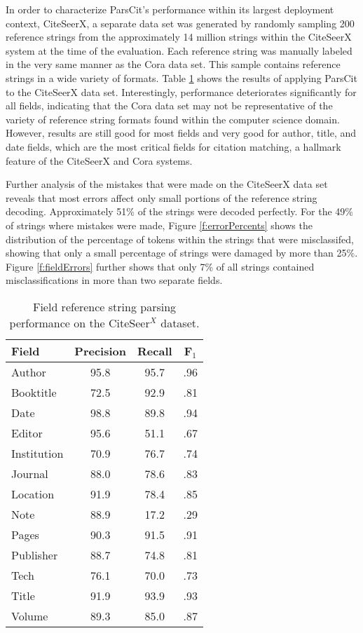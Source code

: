 \documentclass[10pt, a4paper]{article}
\begin{document}
In order to characterize ParsCit's performance within its largest deployment
context, CiteSeerX, a separate data set was generated by randomly sampling
200 reference strings from the approximately 14 million strings within the
CiteSeerX system at the time of the evaluation.  Each reference string was
manually labeled in the very same manner as the Cora data set.  This sample
contains reference strings in a wide variety of formats.  Table \ref{t:eval-csx}
shows the results of applying ParsCit to the CiteSeerX data set.  
Interestingly, performance
deteriorates significantly for all fields, indicating that the Cora data set may not
be representative of the variety of reference string formats found within the
computer science domain.  However, results are still good for most fields and very
good for author, title, and date fields, which are the most critical fields for
citation matching, a hallmark feature of the CiteSeerX and Cora systems.

Further analysis of the mistakes that were made on the CiteSeerX data set
reveals that most errors affect only small portions of the reference string decoding.
Approximately 51\% of the strings were decoded perfectly.  For the 49\% of
strings where mistakes were made, Figure \ref{f:errorPercents} shows the
distribution of the percentage of tokens within the strings that were misclassifed,
showing that only a small percentage of strings were damaged by more than
25\%.  Figure \ref{f:fieldErrors} further shows that only 7\% of all strings contained
misclassifications in more than two separate fields.

\begin{table}[htb]
\centering
\begin{tabular}{|l|c|c|c|}
\hline
Field & Precision & Recall & F$_1$ \\
\hline
Author	& 95.8	& 95.7	& .96 \\
Booktitle	& 72.5	& 92.9	& .81 \\
Date	& 98.8	& 89.8	& .94 \\
Editor	& 95.6	& 51.1	& .67 \\
Institution	& 70.9	& 76.7	& .74 \\
Journal	& 88.0	& 78.6	& .83 \\
Location	& 91.9	& 78.4	& .85 \\
Note	& 88.9	& 17.2	& .29 \\
Pages	& 90.3	& 91.5	& .91 \\
Publisher	& 88.7	& 74.8	& .81 \\
Tech	& 76.1	& 70.0	& .73 \\
Title	& 91.9	& 93.9	& .93 \\
Volume	& 89.3	& 85.0	& .87 \\
\hline
\end{tabular}
\caption{Field reference string parsing performance on the CiteSeer$^X$ dataset.}
\label{t:eval-csx}
\end{table}
\end{document}

